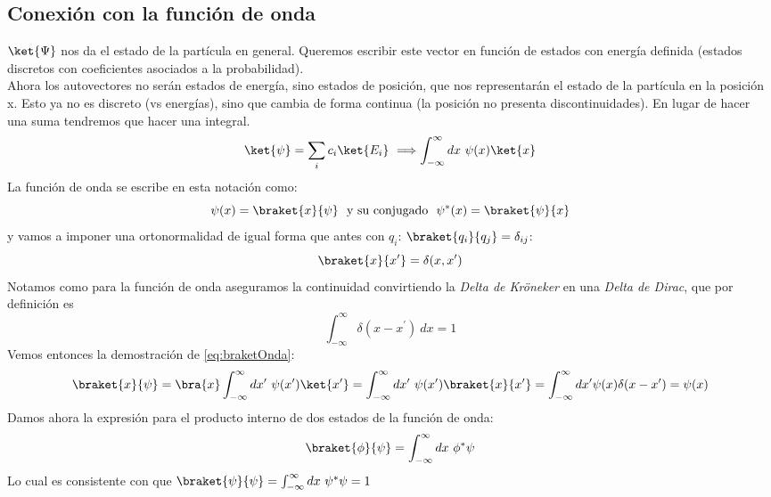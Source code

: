 \documentclass{report}
\begin{document}
    \subsection{Conexión con la función de onda}
      \noindent $\ket{\Psi}$ nos da el estado de la partícula en general. Queremos escribir este vector en función de estados con energía definida (estados discretos con coeficientes asociados a la probabilidad). \\

      \noindent Ahora los autovectores no serán estados de energía, sino estados de posición, que nos representarán el estado de la partícula en la posición x. Esto ya no es discreto (vs energías), sino que cambia de forma continua (la posición no presenta discontinuidades). En lugar de hacer una suma tendremos que hacer una integral.
      \[\ket{\psi}=\sum_i c_i\ket{E_i}\ \Longrightarrow \int_{-\infty}^\infty dx\ \psi(x)\ket{x}\]
      \noindent La función de onda se escribe en esta notación como:
      \begin{equation}
        \psi(x)=\braket{x}{\psi}\ \text{ y su conjugado}\ \ \psi^*(x)=\braket{\psi}{x}
        \label{eq:braketOnda}
      \end{equation}
        y vamos a imponer una ortonormalidad de igual forma que antes con $q_i$: $\braket{q_i}{q_j}=\delta_{ij}$:
      \begin{equation}
        \braket{x}{x^\prime}=\delta(x,x^\prime)
      \end{equation}
      Notamos como para la función de onda aseguramos la continuidad convirtiendo la \textit{Delta de Kröneker} en una \textit{Delta de Dirac}, que por
      definición es \[\int_{-\infty}^{\infty}\delta(x-x^\prime)\ dx=1\]
      Vemos entonces la demostración de \ref{eq:braketOnda}:
      \[\braket{x}{\psi}=\bra{x}\int_{-\infty}^{\infty}dx^\prime\ \psi(x^\prime)\ket{x^\prime}=
      \int_{-\infty}^{\infty}dx^\prime\ \psi(x^\prime)\braket{x}{x^\prime}=\int_{-\infty}^{\infty}dx^\prime
      \psi(x)\delta(x-x^\prime)=\psi(x)\]
      Damos ahora la expresión para el producto interno de dos estados de la función de onda:
      \begin{equation}
        \braket{\phi}{\psi}=\int_{-\infty}^{\infty}dx\ \phi^*\psi
      \end{equation}
      Lo cual es consistente con que $\braket{\psi}{\psi}=\int_{-\infty}^{\infty} dx\ \psi^*\psi=1$
      
\end{document}
